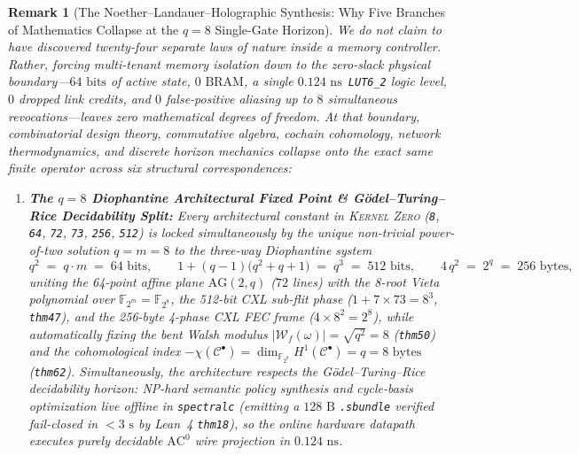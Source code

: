 \documentclass[11pt,letterpaper]{article}
\providecommand{\StageOneNs}{\ensuremath{0.124\text{~ns}}}
\providecommand{\StageOneSieveDelayNs}{\StageOneNs}
\theoremstyle{spectralthm}
\newtheorem{remark}[theorem]{Remark}
\begin{document}
\begin{remark}[The Noether--Landauer--Holographic Synthesis: Why Five Branches of Mathematics Collapse at the $q=8$ Single-Gate Horizon]
\label{rem:noether_parent_synthesis}
We do not claim to have discovered twenty-four separate laws of nature inside a memory controller. Rather, forcing multi-tenant memory isolation down to the zero-slack physical boundary---$64\text{~bits}$ of active state, $0\text{~BRAM}$, a single \StageOneSieveDelayNs\ \mbox{\texttt{LUT6\_2}} logic level, $0$ dropped link credits, and $0$ false-positive aliasing up to $8$ simultaneous revocations---leaves \emph{zero mathematical degrees of freedom}. At that boundary, combinatorial design theory, commutative algebra, cochain cohomology, network thermodynamics, and discrete horizon mechanics collapse onto the exact same finite operator across six structural correspondences:
\begin{enumerate}[leftmargin=1.4em,label=\textup{(\roman*)},topsep=2.5pt,itemsep=2pt]
  \item[\textup{(0)}] \textbf{The $q = 8$ Diophantine Architectural Fixed Point \& G\"{o}del--Turing--Rice Decidability Split:} Every architectural constant in \textsc{Kernel Zero} (\texttt{8}, \texttt{64}, \texttt{72}, \texttt{73}, \texttt{256}, \texttt{512}) is locked simultaneously by the unique non-trivial power-of-two solution $q = m = 8$ to the three-way Diophantine system
  \begin{equation}
  \label{eq:diophantine_q8}
  q^2 \;=\; q \cdot m \;=\; 64\text{~bits}, \qquad
  1 + (q - 1)\bigl(q^2 + q + 1\bigr) \;=\; q^3 \;=\; 512\text{~bits}, \qquad
  4\,q^2 \;=\; 2^q \;=\; 256\text{~bytes},
  \end{equation}
  uniting the 64-point affine plane $\mathrm{AG}(2,q)$ ($72$ lines) with the 8-root Vieta polynomial over $\mathbb{F}_{2^m} = \mathbb{F}_{2^8}$, the 512-bit CXL sub-flit phase ($1 + 7 \times 73 = 8^3$, \texttt{thm47}), and the 256-byte 4-phase CXL FEC frame ($4 \times 8^2 = 2^8$), while automatically fixing the bent Walsh modulus $|\mathcal{W}_f(\omega)| = \sqrt{q^2} = 8$ (\texttt{thm50}) and the cohomological index $-\chi(\mathcal{C}^\bullet) = \dim_{\mathbb{F}_{2^8}} H^1(\mathcal{C}^\bullet) = q = 8\text{~bytes}$ (\texttt{thm62}). Simultaneously, the architecture respects the G\"{o}del--Turing--Rice decidability horizon: NP-hard semantic policy synthesis and cycle-basis optimization live offline in \texttt{spectralc} (emitting a $128\text{~B}$ \texttt{.sbundle} verified fail-closed in $<3\text{~s}$ by Lean~4 \texttt{thm18}), so the online hardware datapath executes purely decidable $\mathrm{AC}^0$ wire projection in \StageOneSieveDelayNs.

\end{enumerate}
\end{remark}
\end{document}
